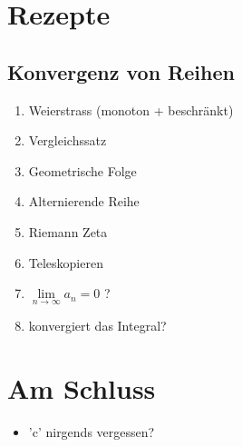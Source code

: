 \section{Rezepte}
\subsection*{Konvergenz von Reihen}
\begin{enumerate}
\item Weierstrass (monoton + beschränkt)
\item Vergleichssatz
\item Geometrische Folge
\item Alternierende Reihe
\item Riemann Zeta
\item Teleskopieren
\item $\lim \limits_{n \rightarrow \infty} a_n = 0$ ?
\item konvergiert das Integral?
\end{enumerate}

\section{Am Schluss}
\begin{itemize}
	\item 'c' nirgends vergessen?
\end{itemize}